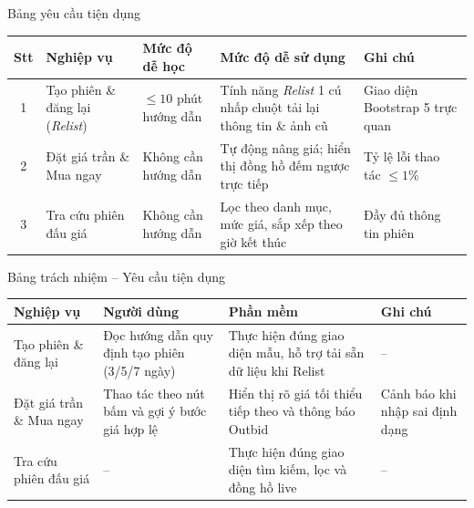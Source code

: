 \documentclass[aspectratio=169, 10pt]{beamer}
\begin{document}
\begin{frame}{Bảng yêu cầu tiện dụng}
    \footnotesize
    \begin{table}[h]
        \centering
        \begin{tabular}{c p{3.0cm} p{2.8cm} p{3.8cm} p{2.5cm}}
            \toprule
            \textbf{Stt} & \textbf{Nghiệp vụ} & \textbf{Mức độ dễ học} & \textbf{Mức độ dễ sử dụng} & \textbf{Ghi chú} \\
            \midrule
            1 & Tạo phiên \& đăng lại (\textit{Relist}) & $\le 10$ phút hướng dẫn & Tính năng \textit{Relist} 1 cú nhấp chuột tải lại thông tin \& ảnh cũ & Giao diện Bootstrap 5 trực quan \\
            \midrule
            2 & Đặt giá trần \& Mua ngay & Không cần hướng dẫn & Tự động nâng giá; hiển thị đồng hồ đếm ngược trực tiếp & Tỷ lệ lỗi thao tác $\le 1\%$ \\
            \midrule
            3 & Tra cứu phiên đấu giá & Không cần hướng dẫn & Lọc theo danh mục, mức giá, sắp xếp theo giờ kết thúc & Đầy đủ thông tin phiên \\
            \bottomrule
        \end{tabular}
    \end{table}
\end{frame}

\begin{frame}{Bảng trách nhiệm -- Yêu cầu tiện dụng}
    \footnotesize
    \begin{table}[h]
        \centering
        \begin{tabular}{p{3.0cm} p{3.5cm} p{3.8cm} p{2.6cm}}
            \toprule
            \textbf{Nghiệp vụ} & \textbf{Người dùng} & \textbf{Phần mềm} & \textbf{Ghi chú} \\
            \midrule
            Tạo phiên \& đăng lại & Đọc hướng dẫn quy định tạo phiên (3/5/7 ngày) & Thực hiện đúng giao diện mẫu, hỗ trợ tải sẵn dữ liệu khi Relist & -- \\
            \midrule
            Đặt giá trần \& Mua ngay & Thao tác theo nút bấm và gợi ý bước giá hợp lệ & Hiển thị rõ giá tối thiểu tiếp theo và thông báo Outbid & Cảnh báo khi nhập sai định dạng \\
            \midrule
            Tra cứu phiên đấu giá & -- & Thực hiện đúng giao diện tìm kiếm, lọc và đồng hồ live & -- \\
            \bottomrule
        \end{tabular}
    \end{table}
\end{frame}
\end{document}
